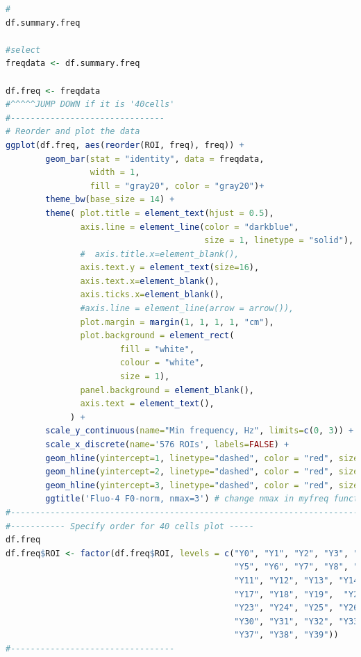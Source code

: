 \documentclass{biophys-new}
\begin{document}
\begin{lstlisting}[language=R]
#
df.summary.freq

#select
freqdata <- df.summary.freq

df.freq <- freqdata
#^^^^^JUMP DOWN if it is '40cells'
#-------------------------------
# Reorder and plot the data
ggplot(df.freq, aes(reorder(ROI, freq), freq)) +
        geom_bar(stat = "identity", data = freqdata,
                 width = 1,
                 fill = "gray20", color = "gray20")+
        theme_bw(base_size = 14) +
        theme( plot.title = element_text(hjust = 0.5),
               axis.line = element_line(color = "darkblue",
                                        size = 1, linetype = "solid"),
               #  axis.title.x=element_blank(),
               axis.text.y = element_text(size=16),
               axis.text.x=element_blank(),
               axis.ticks.x=element_blank(),
               #axis.line = element_line(arrow = arrow()),
               plot.margin = margin(1, 1, 1, 1, "cm"),
               plot.background = element_rect(
                       fill = "white",
                       colour = "white",
                       size = 1),
               panel.background = element_blank(),
               axis.text = element_text(),
             ) +
        scale_y_continuous(name="Min frequency, Hz", limits=c(0, 3)) +
        scale_x_discrete(name='576 ROIs', labels=FALSE) +
        geom_hline(yintercept=1, linetype="dashed", color = "red", size = 1) +
        geom_hline(yintercept=2, linetype="dashed", color = "red", size = 1) +
        geom_hline(yintercept=3, linetype="dashed", color = "red", size = 1) +
        ggtitle('Fluo-4 F0-norm, nmax=3') # change nmax in myfreq function!
#---------------------------------------------------------------------------
#----------- Specify order for 40 cells plot -----
df.freq
df.freq$ROI <- factor(df.freq$ROI, levels = c("Y0", "Y1", "Y2", "Y3", "Y4",
                                              "Y5", "Y6", "Y7", "Y8", "Y9", "Y10",
                                              "Y11", "Y12", "Y13", "Y14", "Y15", "Y16",
                                              "Y17", "Y18", "Y19",  "Y20", "Y21", "Y22",
                                              "Y23", "Y24", "Y25", "Y26", "Y27", "Y28", "Y29",
                                              "Y30", "Y31", "Y32", "Y33", "Y34", "Y35", "Y36",
                                              "Y37", "Y38", "Y39"))
#---------------------------------


\end{lstlisting}
\end{document}
